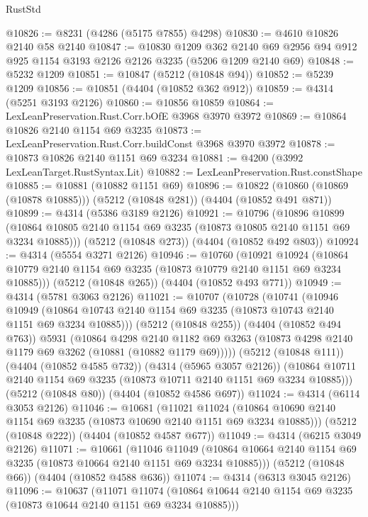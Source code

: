 \begin{lexlean}{RustStd}
\begin{coremodule}
{\begin{coremodule}
{{{{{{{{{{{{{{{{@10826 := @8231 (@4286 (@5175 @7855) @4298)
@10830 := @4610 @10826 @2140 @58 @2140
@10847 := @10830
    @1209
    @362
    @2140
    @69
    @2956
    @94
    @912
    @925
    @1154
    @3193
    @2126
    @2126
    @3235
    (@5206 @1209 @2140 @69)
@10848 := @5232 @1209
@10851 := @10847 (@5212 (@10848 @94))
@10852 := @5239 @1209
@10856 := @10851 (@4404 (@10852 @362 @912))
@10859 := @4314 (@5251 @3193 @2126)
@10860 := @10856 @10859
@10864 := LexLeanPreservation.Rust.Corr.bOfE @3968 @3970 @3972
@10869 := @10864 @10826 @2140 @1154 @69 @3235
@10873 := LexLeanPreservation.Rust.Corr.buildConst @3968 @3970 @3972
@10878 := @10873 @10826 @2140 @1151 @69 @3234
@10881 := @4200 (@3992 LexLeanTarget.RustSyntax.Lit)
@10882 := LexLeanPreservation.Rust.constShape
@10885 := @10881 (@10882 @1151 @69)
@10896 := @10822 (@10860 (@10869 (@10878 @10885))) (@5212 (@10848 @281)) (@4404 (@10852 @491 @871))
@10899 := @4314 (@5386 @3189 @2126)
@10921 := @10796
    (@10896
      @10899
      (@10864 @10805 @2140 @1154 @69 @3235 (@10873 @10805 @2140 @1151 @69 @3234 @10885)))
    (@5212 (@10848 @273))
    (@4404 (@10852 @492 @803))
@10924 := @4314 (@5554 @3271 @2126)
@10946 := @10760
    (@10921
      @10924
      (@10864 @10779 @2140 @1154 @69 @3235 (@10873 @10779 @2140 @1151 @69 @3234 @10885)))
    (@5212 (@10848 @265))
    (@4404 (@10852 @493 @771))
@10949 := @4314 (@5781 @3063 @2126)
@11021 := @10707
    (@10728
      (@10741
        (@10946
          @10949
          (@10864 @10743 @2140 @1154 @69 @3235 (@10873 @10743 @2140 @1151 @69 @3234 @10885)))
        (@5212 (@10848 @255))
        (@4404 (@10852 @494 @763))
        @5931
        (@10864
          @4298
          @2140
          @1182
          @69
          @3263
          (@10873 @4298 @2140 @1179 @69 @3262 (@10881 (@10882 @1179 @69)))))
      (@5212 (@10848 @111))
      (@4404 (@10852 @4585 @732))
      (@4314 (@5965 @3057 @2126))
      (@10864 @10711 @2140 @1154 @69 @3235 (@10873 @10711 @2140 @1151 @69 @3234 @10885)))
    (@5212 (@10848 @80))
    (@4404 (@10852 @4586 @697))
@11024 := @4314 (@6114 @3053 @2126)
@11046 := @10681
    (@11021
      @11024
      (@10864 @10690 @2140 @1154 @69 @3235 (@10873 @10690 @2140 @1151 @69 @3234 @10885)))
    (@5212 (@10848 @222))
    (@4404 (@10852 @4587 @677))
@11049 := @4314 (@6215 @3049 @2126)
@11071 := @10661
    (@11046
      @11049
      (@10864 @10664 @2140 @1154 @69 @3235 (@10873 @10664 @2140 @1151 @69 @3234 @10885)))
    (@5212 (@10848 @66))
    (@4404 (@10852 @4588 @636))
@11074 := @4314 (@6313 @3045 @2126)
@11096 := @10637
    (@11071
      @11074
      (@10864 @10644 @2140 @1154 @69 @3235 (@10873 @10644 @2140 @1151 @69 @3234 @10885)))
}}}}}}}}}}}}}}}}
\end{coremodule}}
\end{coremodule}
\end{lexlean}
